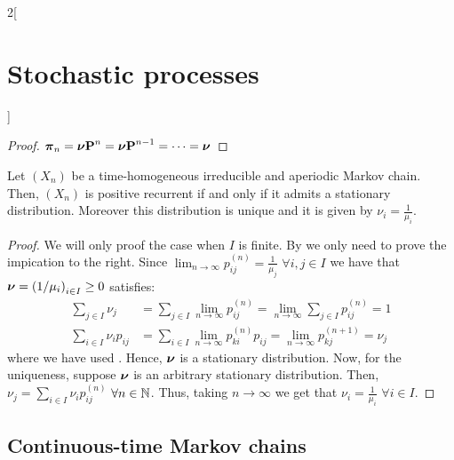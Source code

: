 \documentclass[../../../main_math.tex]{subfiles}
\begin{document}
\begin{multicols}{2}[\section{Stochastic processes}]
  \begin{proof}
    $\displaystyle
      \boldsymbol{\mathrm{\pi}}_{n}=\boldsymbol{\mathrm{\nu}}\boldsymbol{\mathrm{P}}^n=\boldsymbol{\mathrm{\nu}}\boldsymbol{\mathrm{P}}^{n-1}=\cdots=\boldsymbol{\mathrm{\nu}}
    $
  \end{proof}
  \begin{theorem}
    Let $(X_n)$ be a time-homogeneous irreducible and aperiodic Markov chain. Then, $(X_n)$ is positive recurrent if and only if it admits a stationary distribution. Moreover this distribution is unique and it is given by $\nu_i=\frac{1}{\mu_i}$.
  \end{theorem}
  \begin{proof}
    We will only proof the case when $I$ is finite. By  we only need to prove the impication to the right. Since $\displaystyle\lim_{n\to\infty}p_{ij}^{(n)}=\frac{1}{\mu_j}$ $\forall i,j\in I$ we have that $\boldsymbol{\mathrm{\nu}}={(1/\mu_i)}_{i\in I}\geq 0$ satisfies:
    \begin{align*}
      \sum_{j\in I}\nu_j        & =\sum_{j\in I}\lim_{n\to\infty}p_{ij}^{(n)}=\lim_{n\to\infty}\sum_{j\in I}p_{ij}^{(n)}=1 \\
      \sum_{i\in I}\nu_i p_{ij} & =\sum_{i\in I}\lim_{n\to\infty}p_{ki}^{(n)}p_{ij}=\lim_{n\to\infty}p_{kj}^{(n+1)}=\nu_j
    \end{align*}
    where we have used . Hence, $\boldsymbol{\mathrm{\nu}}$ is a stationary distribution. Now, for the uniqueness, suppose $\boldsymbol{\mathrm{\nu}}$ is an arbitrary stationary distribution. Then, $\nu_j=\sum_{i\in I}\nu_i p_{ij}^{(n)}$ $\forall n\in\mathbb{N}$. Thus, taking $n\to\infty$ we get that $\nu_i = \frac{1}{\mu_i}$ $\forall i\in I$.
  \end{proof}
  \subsection{Continuous-time Markov chains}

\end{multicols}
\end{document}

